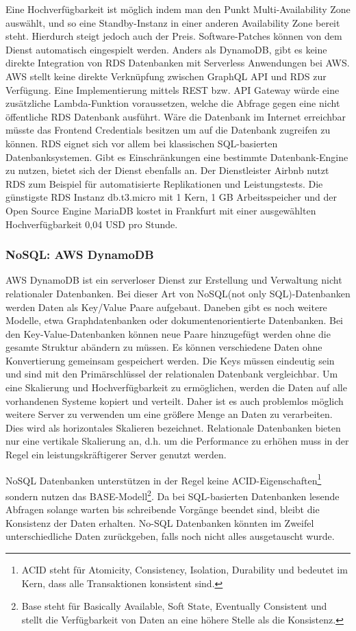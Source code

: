 Eine Hochverfügbarkeit ist möglich indem man den Punkt Multi-Availability Zone auswählt, und so eine Standby-Instanz in einer anderen
Availability Zone bereit steht. Hierdurch steigt jedoch auch der Preis. Software-Patches können von dem Dienst automatisch eingespielt werden.
Anders als DynamoDB, gibt es keine direkte Integration von RDS Datenbanken mit Serverless Anwendungen bei AWS.
AWS stellt keine direkte Verknüpfung zwischen GraphQL API und RDS zur Verfügung. Eine Implementierung mittels REST bzw. API Gateway würde eine zusätzliche Lambda-Funktion voraussetzen, welche
die Abfrage gegen eine nicht öffentliche RDS Datenbank ausführt. Wäre die Datenbank im Internet erreichbar müsste das Frontend Credentials besitzen um auf die Datenbank zugreifen zu können.
RDS eignet sich vor allem bei klassischen SQL-basierten Datenbanksystemen. Gibt es Einschränkungen eine bestimmte Datenbank-Engine zu nutzen, bietet sich der Dienst ebenfalls an.
Der Dienstleister Airbnb nutzt RDS zum Beispiel für automatisierte Replikationen und Leistungstests.
Die günstigste RDS Instanz \glqq db.t3.micro\grqq{} mit 1 Kern, 1 GB Arbeitsspeicher und der Open Source Engine MariaDB kostet in Frankfurt mit einer ausgewählten Hochverfügbarkeit 0,04 USD pro Stunde. \cite[]{RDS}


\subsubsection{NoSQL: AWS DynamoDB}
AWS DynamoDB ist ein serverloser Dienst zur Erstellung und Verwaltung nicht relationaler Datenbanken.
Bei dieser Art von NoSQL(not only SQL)-Datenbanken werden Daten als Key/Value Paare aufgebaut. Daneben gibt es noch weitere Modelle, etwa Graphdatenbanken oder dokumentenorientierte
Datenbanken.
Bei den Key-Value-Datenbanken können neue Paare hinzugefügt werden ohne die gesamte Struktur abändern zu müssen. Es können verschiedene Daten ohne Konvertierung gemeinsam
gespeichert werden.
Die Keys müssen eindeutig sein und sind mit den Primärschlüssel der relationalen Datenbank vergleichbar.
Um eine Skalierung und Hochverfügbarkeit zu ermöglichen, werden die Daten auf alle vorhandenen Systeme kopiert und verteilt. Daher ist es auch problemlos möglich weitere
Server zu verwenden um eine größere Menge an Daten zu verarbeiten. Dies wird als horizontales Skalieren bezeichnet.
Relationale Datenbanken bieten nur eine vertikale Skalierung an, d.h. um die Performance zu erhöhen muss in der Regel ein leistungskräftigerer Server genutzt werden.

NoSQL Datenbanken unterstützen in der Regel keine ACID-Eigenschaften\footnote{ACID steht für Atomicity, Consistency, Isolation, Durability und bedeutet im Kern, dass
alle Transaktionen konsistent sind.} sondern nutzen das BASE-Modell\footnote{Base steht für Basically Available, Soft State, Eventually Consistent und
stellt die Verfügbarkeit von Daten an eine höhere Stelle als die Konsistenz.}.
Da bei SQL-basierten Datenbanken lesende Abfragen solange warten bis schreibende Vorgänge beendet sind, bleibt die Konsistenz der Daten erhalten.
No-SQL Datenbanken könnten im Zweifel unterschiedliche Daten zurückgeben, falls noch nicht alles ausgetauscht wurde. \cite[]{Datenbankvergleich}

